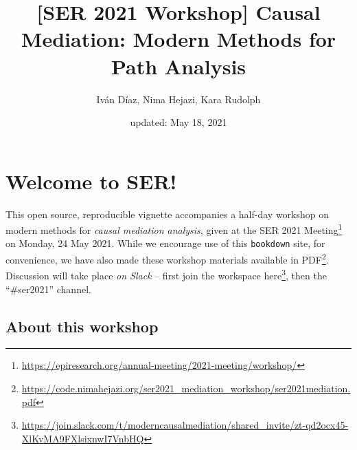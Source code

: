 \documentclass[
  12pt,
]{book}
\title{{[}SER 2021 Workshop{]} Causal Mediation: Modern Methods for Path Analysis}
\author{Iván Díaz, Nima Hejazi, Kara Rudolph}
\date{updated: May 18, 2021}
\newcommand{\passthrough}[1]{#1}
\renewcommand{\href}[2]{#2\footnote{\url{#1}}}
\theoremstyle{definition}
\theoremstyle{definition}
\theoremstyle{definition}
\newcommand{\1}{\mathbbm{1}}
\begin{document}
\maketitle


\thispagestyle{empty}

\begin{center}
\end{center}

\setlength{\abovedisplayskip}{-5pt}
\setlength{\abovedisplayshortskip}{-5pt}

\mainmatter

{
\hypersetup{linkcolor=}
\setcounter{tocdepth}{2}
\tableofcontents
}
\hypertarget{welcome-to-ser}{%
\chapter*{Welcome to SER!}\label{welcome-to-ser}}


This open source, reproducible vignette accompanies a half-day workshop on
modern methods for \emph{causal mediation analysis}, given at the \href{https://epiresearch.org/annual-meeting/2021-meeting/workshop/}{SER 2021
Meeting} on
Monday, 24 May 2021. While we encourage use of this \passthrough{\lstinline!bookdown!} site, for
convenience, we have also made these workshop materials \href{https://code.nimahejazi.org/ser2021_mediation_workshop/ser2021mediation.pdf}{available in
PDF}.
Discussion will take place \emph{on Slack} -- first join the workspace
\href{https://join.slack.com/t/moderncausalmediation/shared_invite/zt-qd2ocx45-XlKvMA9FXlsixnwI7VnbHQ}{here},
then the ``\#ser2021'' channel.

\hypertarget{about}{%
\section{About this workshop}\label{about}}
\end{document}
